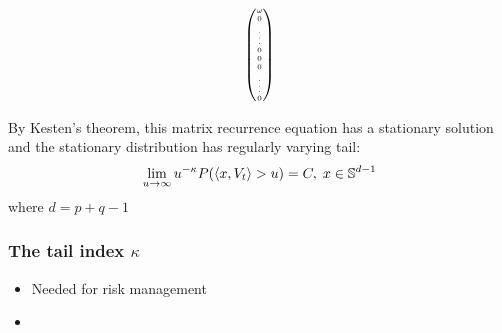 \documentclass{beamer}
\begin{document}
\begin{frame}
\begin{equation*}
\begin{tiny}
\begin{pmatrix}
        \omega \\
        0 \\
        \vdots \\
        0 \\
        0 \\
        0 \\
        \vdots \\
        0 \\
      \end{pmatrix}
      \end{tiny}
    \end{equation*}
    \begin{scriptsize}
      By Kesten's  theorem, this matrix recurrence equation has a
      stationary solution and the stationary distribution has regularly
      varying tail:
      \[
      \lim_{u \to \infty} u^{-\kappa} P(\langle x, V_t\rangle > u) = C,\; x \in \mathbb S^{d-1}
      \]
      where $d = p + q -1$
    \end{scriptsize}
  \end{frame}

  \begin{frame}
    \frametitle{The tail index $\kappa$}
    \begin{itemize}
    \item Needed for risk management
    \item 
    \end{itemize}
  \end{frame}


\end{document}
